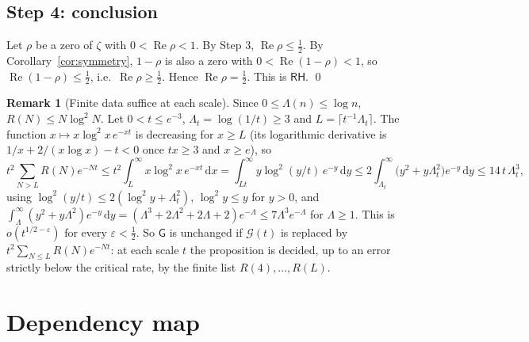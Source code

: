 \documentclass[11pt]{article}
\theoremstyle{definition}
\newtheorem{remark}[theorem]{Remark}
\newcommand{\Lam}{\Lambda}
\newcommand{\re}{\operatorname{Re}}
\newcommand{\G}{\mathcal{G}}
\newcommand{\RH}{\mathsf{RH}}
\newcommand{\GR}{\mathsf{G}}
\newcommand{\dd}{\,\mathrm{d}}
\begin{document}
\subsection*{Step 4: conclusion}

Let $\rho$ be a zero of $\zeta$ with $0<\re\rho<1$. By Step 3, $\re\rho\le\tfrac12$. By Corollary~\ref{cor:symmetry}, $1-\rho$ is also a zero with $0<\re(1-\rho)<1$, so $\re(1-\rho)\le\tfrac12$, i.e.\ $\re\rho\ge\tfrac12$. Hence $\re\rho=\tfrac12$. This is $\RH$. \qed

\begin{remark}[Finite data suffice at each scale]\label{rem:finite}
Since $0\le\Lam(n)\le\log n$, $R(N)\le N\log^{2}N$. Let $0<t\le e^{-3}$, $\Lambda_t=\log(1/t)\ge3$ and $L=\lceil t^{-1}\Lambda_t\rceil$.
The function $x\mapsto x\log^{2}x\,e^{-xt}$ is decreasing for $x\ge L$ (its logarithmic derivative is $1/x+2/(x\log x)-t<0$ once $tx\ge3$ and $x\ge e$), so
\[
t^{2}\sum_{N>L}R(N)e^{-Nt}\le t^{2}\!\int_{L}^\infty\! x\log^{2}x\,e^{-xt}\dd x
=\int_{Lt}^\infty\! y\log^{2}(y/t)\,e^{-y}\dd y
\le2\!\int_{\Lambda_t}^\infty\!\bigl(y^{2}+y\Lambda_t^{2}\bigr)e^{-y}\dd y
\le 14\,t\,\Lambda_t^{3},
\]
using $\log^{2}(y/t)\le2(\log^{2}y+\Lambda_t^{2})$, $\log^{2}y\le y$ for $y>0$, and
$\int_{\Lambda}^\infty(y^{2}+y\Lambda^{2})e^{-y}\dd y=(\Lambda^{3}+2\Lambda^{2}+2\Lambda+2)e^{-\Lambda}\le7\Lambda^{3}e^{-\Lambda}$ for $\Lambda\ge1$.
This is $o(t^{1/2-\varepsilon})$ for every $\varepsilon<\tfrac12$.
So $\GR$ is unchanged if $\G(t)$ is replaced by $t^{2}\sum_{N\le L}R(N)e^{-Nt}$: at each scale $t$ the proposition is decided, up to an error strictly below the critical rate, by the finite list $R(4),\dots,R(L)$.
\end{remark}

\section{Dependency map}\label{sec:map}
\end{document}
